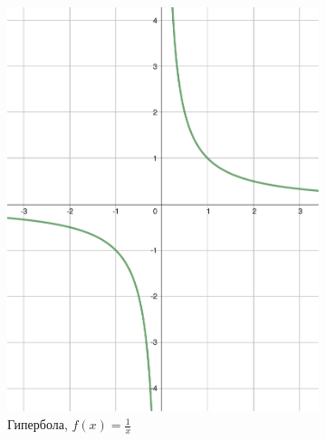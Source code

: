 \begin{figure}[h]
    \centering
    \begin{subfigure}{0.35\textwidth}
        \includegraphics[width=\textwidth]{tex/chapter_2/assets/y=1_div_by_x.pdf}
        \caption*{Гипербола, $f(x) = \frac{1}{x}$}
    \end{subfigure}
    \hfill
    \begin{subfigure}{0.35\textwidth}

\end{subfigure}
\end{figure}
